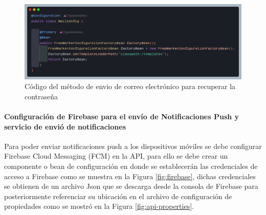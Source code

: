 \begin{figure}[H]
    \centering
    \includegraphics[width=1\textwidth]{resources/images/fremaker}
    \caption{Código del método de envio de correo electrónico para recuperar la contraseña}
    \label{fig:mail-service-method}
\end{figure}

\paragraph{Configuración de Firebase para el envío de Notificaciones Push y servicio de envió de notificaciones}

Para poder enviar notificaciones push a los dispositivos móviles se debe configurar Firebase Cloud Messaging (FCM) en la API, para ello se debe crear un componente o bean de configuración en donde se establecerán las credenciales de acceso a Firebase como se muestra en la Figura \ref{fig:firebase}, dichas credenciales se obtienen de un archivo Json que se descarga desde la consola de Firebase para posteriormente referenciar su ubicación en el archivo de configuración de propiedades como se mostró en la Figura \ref{fig:api-properties}.


